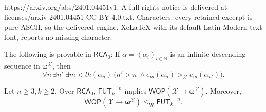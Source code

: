 \documentclass[10pt,a4paper]{amsart}
\newcommand\FUT{\mathsf{FUT}}
\newcommand\Nat{\mathbb{N}}
\newcommand\RCA{\mathsf{RCA}}
\newcommand\WOP{\mathsf{WOP}}
\newcommand\W{\mathrm{W}}
\newcommand\boldomega{\pmb{\omega}}
\newcommand{\LoX}{\mathcal{X}}
\begin{document}
https://arxiv.org/abs/2401.04451v1. A full rights notice is delivered at licenses/arxiv-2401.04451-CC-BY-4.0.txt. Characters: every retained excerpt is pure ASCII, so the delivered engine, XeLaTeX with its default Latin Modern text font, reports no missing character.
\begin{lemma}\label{lem:decribile-terms} The following is provable in $\RCA_0$: If $\alpha=(\alpha_i)_{i\in\Nat}$ is an infinite descending sequence in $\boldomega^\LoX$, then
$$\forall n\ \exists n'\ \exists m < lh(\alpha_n) \ \big(n'>n \ \land e_m(\alpha_n) >_{\LoX} e_m(\alpha_{n'})\big).$$
\end{lemma}

\begin{theorem}\label{prop:RTomega}
Let $n \geq 3, k \geq 2$. Over $\RCA_0$, $\FUT^{=n}_k$ implies $\WOP(\mathcal{X} \to \boldomega^\mathcal{X})$. Moreover, 
$$\WOP(\mathcal{X} \to \boldomega^\LoX) \leq_\W \FUT^{=n}_k.$$
\end{theorem}
\end{document}
